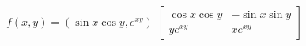 {
$f(x,y) = (\sin x\cos y, e^{xy})$
}
{
$\begin{bmatrix} 
\cos x\cos y & -\sin x\sin y\\
ye^{xy} & xe^{xy}
\end{bmatrix}$
}

	